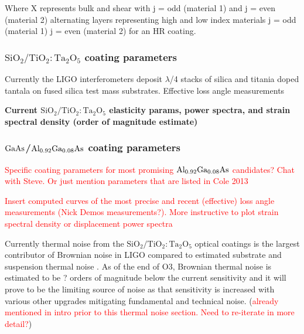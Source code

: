 Where X represents bulk and shear with j = odd (material 1) and j = even (material 2) alternating layers representing high and low index materials j = odd (material 1) j = even (material 2) for an HR coating.


\subsubsection{$\mathrm{SiO_2}/\mathrm{TiO_2:Ta_2O_5}$ coating parameters}
Currently the LIGO interferometers deposit $\lambda$/4 stacks of silica and titania doped tantala on fused silica test mass substrates. Effective loss angle measurements \cite{Harry:06}

\textbf{Current $\mathrm{SiO_2}/\mathrm{TiO_2:Ta_2O_5}$ elasticity params, power spectra, and strain spectral density (order of magnitude estimate)}

\subsubsection{$\mathrm{GaAs}$/$\mathrm{Al_{0.92}Ga_{0.08}As}$ coating parameters}
\textcolor{red}{Specific coating parameters for most promising $\mathrm{Al_{0.92}Ga_{0.08}As}$ candidates? Chat with Steve. Or just mention parameters that are listed in Cole 2013}
\cite{Cole:2013}

\textcolor{red}{Insert computed curves of the most precise and recent (effective) loss angle measurements (Nick Demos measurements?). More instructive to plot strain spectral density or displacement power spectra}

\noindent Currently thermal noise from the $\mathrm{SiO_2}/\mathrm{TiO_2:Ta_2O_5}$ optical coatings is the largest contributor of Brownian noise in LIGO compared to estimated substrate and suspension thermal noise \cite{Harry:06}. As of the end of O3, Brownian thermal noise is estimated to be ? orders of magnitude below the current sensitivity and it will prove to be the limiting source of noise as that sensitivity is increased with various other upgrades mitigating fundamental and technical noise. (\textcolor{red}{already mentioned in intro prior to this thermal noise section. Need to re-iterate in more detail?})
